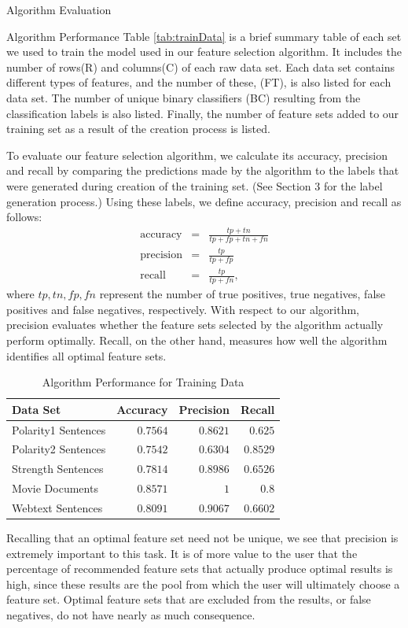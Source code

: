 \documentclass{llncs}
\begin{document}
\begin{section}{Algorithm Evaluation}
\begin{subsection}{Algorithm Performance}
Table \ref{tab:trainData} is a brief summary table of each set we used to train the model used in our feature selection algorithm. It includes the number of rows(R) and columns(C) of each raw data set. Each data set contains different types of features, and the number of these, (FT), is also listed for each data set. The number of unique binary classifiers (BC) resulting from the classification labels is also listed. Finally, the number of feature sets added to our training set as a result of the creation process is listed. 

To evaluate our feature selection algorithm, we calculate its accuracy, precision and recall by comparing the predictions made by the algorithm to the labels that were generated during creation of the training set. (See Section 3 for the label generation process.) Using these labels, we define accuracy, precision and recall as follows:
\begin{eqnarray*}
\text{accuracy} & = & \frac{tp + tn}{tp +fp + tn + fn}\\
\text{precision} &=& \frac{tp}{tp + fp}\\
\text{recall} &=& \frac{tp}{tp +fn},\end{eqnarray*} where $tp,tn,fp,fn$ represent the number of true positives, true negatives, false positives and false negatives, respectively. With respect to our algorithm, precision evaluates whether the feature sets selected by the algorithm actually perform optimally. Recall, on the other hand, measures how well the algorithm identifies all optimal feature sets. 
\begin{table}[ht]
\centering
\caption{Algorithm Performance for Training Data}
\begin{tabular}{l r r r}
\hline \hline
Data Set & Accuracy & Precision&  Recall\\
\hline
Polarity1 Sentences& $0.7564$ & $0.8621 $& $0.625 $\\
Polarity2 Sentences& $0.7542 $ & $0.6304 $& $0.8529$\\
Strength Sentences& $0.7814 $ & $0.8986 $& $0.6526 $\\
Movie Documents& $0.8571 $ & $1 $& $0.8 $\\
Webtext Sentences& $0.8091 $ & $0.9067 $& $0.6602 $\\
\hline
\end{tabular}
\label{tab:performance}
\end{table}
Recalling that an optimal feature set need not be unique, we see that precision is extremely important to this task. It is of more value to the user that the percentage of recommended feature sets that actually produce optimal results is high, since these results are the pool from which the user will ultimately choose a feature set. Optimal feature sets that are excluded from the results, or false negatives, do not have nearly as much consequence. 


\end{subsection}
\end{section}
\end{document}

